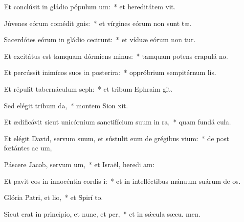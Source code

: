 \item Et conclúsit in gládio pópulum um:~* et hereditátem  vit.
\item Júvenes eórum comédit gnis:~* et vírgines eórum non sunt tæ.
\item Sacerdótes eórum in gládio cecirunt:~* et víduæ eórum non tur.
\item Et excitátus est tamquam dórmiens minus:~* tamquam potens crapulá  no.
\item Et percússit inimícos suos in posterira:~* oppróbrium sempitérnum  lis.
\item Et répulit tabernáculum seph:~* et tribum Ephraim  git.
\item Sed elégit tribum da,~* montem Sion  xit.
\item Et ædificávit sicut unicórnium sanctifícium suum in ra,~* quam fundá  cula.
\item Et elégit David, servum suum, et sústulit eum de grégibus vium:~* de post fœtántes ac um,
\item Páscere Jacob, servum um,~* et Israël, heredi am:
\item Et pavit eos in innocéntia cordis i:~* et in intelléctibus mánuum suárum de os.
\item Glória Patri, et lio,~* et Spirí to.
\item Sicut erat in princípio, et nunc, et per,~* et in sǽcula sæcu. men.
